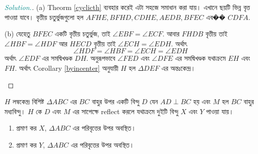 \documentclass[a4paper,11pt]{article}
\newenvironment{sltn}{\begin{proof}[\emph{\textcolor{darkcyan}{Solution.}}]} {\end{proof}}
\begin{document}
\begin{sltn}(a) Theorm \ref{cyclicth} ব্যবহার করেই এটা সহজে সমাধান করা যায়। এখানে ছয়টি ভিন্ন বৃত্ত পাওয়া যাবে। বৃত্তীয় চতুর্ভুজগুলো হল $AFHE,BFHD,CDHE,AEDB,BFEC$ এব�� $CDFA$.
	
	\qquad (b) যেহেতু $BFEC$ একটি বৃত্তীয় চতুর্ভুজ, তাই $\angle EBF=\angle ECF$. আবার $FHDB$ বৃত্তীয় তাই $\angle HBF=\angle HDF$ আর $HECD$ বৃত্তীয় তাই $\angle ECH=\angle EDH$. অর্থাৎ 
	\[ \angle HDF=\angle HBF=\angle ECH=\angle EDH\]
	অর্থাৎ $\angle EDF$ এর সমদ্বিখণ্ডক $DH$. অনুরূপভাবে $\angle FED$ এবং $\angle DFE$ এর সমদ্বিখণ্ডক যথাক্রমে $EH$ এবং $FH$. অর্থাৎ Corollary \ref{byincenter} অনুযায়ী $H$ হল $\Delta DEF$ এর অন্তঃকেন্দ্র। 
	\begin{center} 
	\end{center}
\end{sltn}
\begin{xmpl}
	$H$ লম্বকেন্দ্র বিশিষ্ট $\Delta ABC$ এর $BC$ বাহুর উপর একটি বিন্দু $D$ যেন $AD \perp BC$ হয় এবং $M$ হল $BC$ বাহুর মধ্যবিন্দু। $H$ কে $D$ এবং $M$ এর সাপেক্ষে reflect করলে যথাক্রমে দুইটি বিন্দু $X$ এবং $Y$ পাওয়া যায়। 
	\begin{enumerate}[label=(\alph*), nosep]
		\item প্রমাণ কর $X$, $\Delta ABC$ এর পরিবৃত্তের উপর অবস্থিত।
		\item প্রমাণ কর $Y$, $\Delta ABC$ এর পরিবৃত্তের উপর অবস্থিত।
	\end{enumerate}
\end{xmpl}
\end{document}
